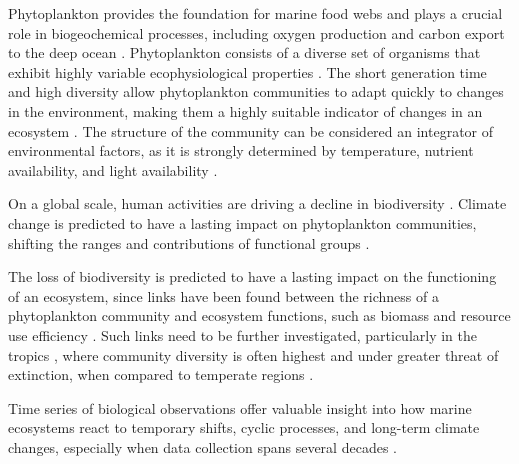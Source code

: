 \documentclass[draft]{agujournal2019}
\begin{document}
    Phytoplankton provides the foundation for marine food webs and plays a crucial role in biogeochemical processes, including oxygen production and carbon export to the deep ocean \cite{falkowski_biogeochemical_1998}.
    Phytoplankton consists of a diverse set of organisms that exhibit highly variable ecophysiological properties \cite{appeltans_magnitude_2012}. The short generation time and high diversity allow phytoplankton communities to adapt quickly to changes in the environment, making them a highly suitable indicator of changes in an ecosystem \cite{alvarez-cobelas_what_1998, di_cavalho_temporal_2023}.
    The structure of the community can be considered an integrator of environmental factors, as it is strongly determined by temperature, nutrient availability, and light availability \cite{mouw_phytoplankton_2016}.

    On a global scale, human activities are driving a decline in biodiversity \cite{tittensor_mid-term_2014}. Climate change is predicted to have a lasting impact on phytoplankton communities, shifting the ranges and contributions of functional groups \cite{henson_future_2021}. 

    
    The loss of biodiversity is predicted to have a lasting impact on the functioning of an ecosystem, since links have been found between the richness of a phytoplankton community and ecosystem functions, such as biomass and resource use efficiency \cite{ptacnik_diversity_2008, lehtinen_phytoplankton_2017}. Such links need to be further investigated, particularly in the tropics \cite{clarke_does_2017}, where community diversity is often highest \cite{brown_why_2014} and under greater threat of extinction, when compared to temperate regions \cite{finnegan_paleontological_2015}.
    
    Time series of biological observations offer valuable insight into how marine ecosystems react to temporary shifts, cyclic processes, and long-term climate changes, especially when data collection spans several decades \cite{carstensen_need_2014, henson_observing_2016}. 
\end{document}
